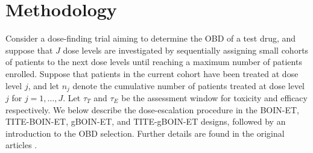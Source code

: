 \section{Methodology}
Consider a dose-finding trial aiming to determine the OBD of a test drug, and suppose that $J$ dose levels are investigated by sequentially assigning small cohorts of patients to the next dose levels until reaching a maximum number of patients enrolled. Suppose that patients in the current cohort have been treated at dose level $j$, and let $n_j$ denote the cumulative number of patients treated at dose level $j$ for $j=1,\ldots,J$. Let $\tau_T$ and $\tau_E$ be the assessment window for toxicity and efficacy respectively. We below describe the dose-escalation procedure in the BOIN-ET, TITE-BOIN-ET, gBOIN-ET, and TITE-gBOIN-ET designs, followed by an introduction to the OBD selection. Further details are found in the original articles \citep{takeda:2018,takeda:2020,takeda:2022a,takeda:2022b,takeda:2023}.

